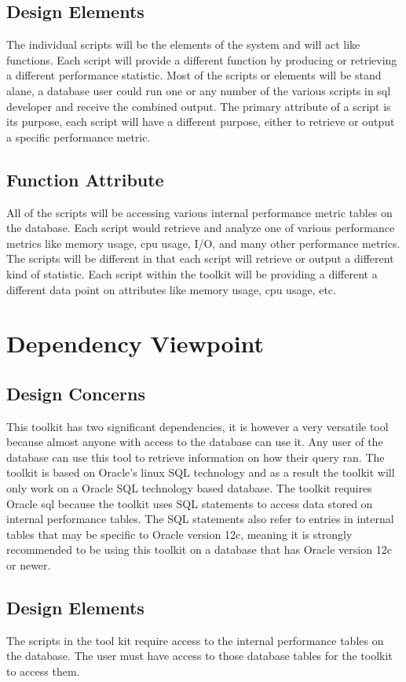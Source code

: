 \documentclass[draftclsnofoot, onecolumn, compsoc, 10pt]{IEEEtran}
\begin{document}
\subsection{Design Elements}
The individual scripts will be the elements of the system and will act like functions.
Each script will provide a different function by producing or retrieving a different performance statistic.
Most of the scripts or elements will be stand alane, a database user could run one or any number of the various scripts in sql developer and receive the combined output.
The primary attribute of a script is its purpose, each script will have a different purpose, either to retrieve or output a specific performance metric.

\subsection{Function Attribute}
All of the scripts will be accessing various internal performance metric tables on the database. Each script would retrieve and analyze one of various performance metrics like memory usage, cpu usage, I/O, and many other performance metrics.
The scripts will be different in that each script will retrieve or output a different kind of statistic.
Each script  within the toolkit will be providing a different a different data point on attributes like memory usage, cpu usage, etc.

\section{Dependency Viewpoint}
\subsection{Design Concerns}
This toolkit has two significant dependencies, it is however a very versatile tool because almost anyone with access to the database can use it.
Any user of the database can use this tool to retrieve information on how their query ran.
The toolkit is based on Oracle's linux SQL technology and as a result the toolkit will only work on a Oracle SQL technology based database.
The toolkit requires Oracle sql because the toolkit uses SQL statements to access data stored on internal performance tables.
The SQL statements also refer to entries in internal tables that may be specific to Oracle version 12c, meaning it is strongly recommended to be using this toolkit on a database that has Oracle version 12c or newer. 
\subsection{Design Elements}
The scripts in the tool kit require access to the internal performance tables on the database. The user must have access to those database tables for the toolkit to access them. 
\end{document}
